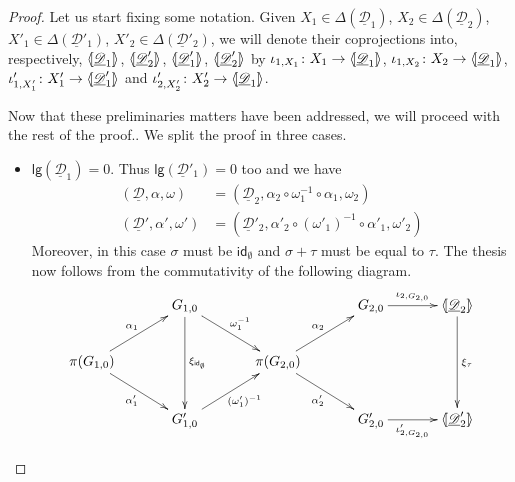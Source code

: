 \documentclass[a4paper]{article}
\newcommand{\id}[1]{\mathsf{id}_{#1}}
\newcommand{\dder}[1]{\mathscr{#1}}
\newcommand{\der}[1]{\underline{\dder{#1}}}
\newcommand{\lpro}{\langle \hspace{-1.85pt}[}
\newcommand{\rpro}{]\hspace{-1.85pt}\rangle}
\newcommand{\lgh}[0]{\mathsf{lg}}
\theoremstyle{definition}
\begin{document}
\begin{proof}
	Let us start fixing some notation. Given $X_1\in \Delta(\der{D}_1)$, $X_2\in \Delta(\der{D}_2)$, $X'_1\in \Delta(\der{D}'_1)$, $X'_2\in \Delta(\der{D}'_2)$, we will denote their coprojections into, respectively, $\lpro \der{D}_1\rpro$, $\lpro \der{D}'_2\rpro$, $\lpro \der{D}'_1\rpro$, $\lpro \der{D}'_2\rpro$ by
	$\iota_{1, X_1}\colon X_1\to \lpro\der{D}_1\rpro$, $\iota_{1, X_2}\colon X_2\to \lpro\der{D}_1\rpro$, $\iota'_{1, X'_1}\colon X'_1\to \lpro\der{D}'_1\rpro$ and $\iota'_{2, X'_2}\colon X'_2\to \lpro\der{D}_1\rpro$.
	
	Now that these preliminaries matters have been addressed, we will proceed with the rest of the proof.. We split the proof in three cases.
	\begin{itemize}
		\item $\lgh(\der{D}_1)=0$. Thus $\lgh(\der{D}'_1)=0$ too  and we have
		\begin{align*}
			(\der{D}, \alpha, \omega)&=(\der{D}_2, \alpha_2\circ \omega_1^{-1}\circ \alpha_1, \omega_2) \\ (\der{D}', \alpha', \omega')&=(\der{D}'_2, \alpha'_2\circ (\omega'_1)^{-1}\circ \alpha'_1, \omega'_2)
		\end{align*}
		Moreover, in this case $\sigma$ must be $\id{\emptyset}$ and $\sigma+\tau$ must be equal to $\tau$. The thesis now follows from the commutativity of the following diagram.
		\[\xymatrix@C=35pt{& G_{1,0}\ar[dd]^{\xi_{\id{\emptyset}}} \ar[dr]^{\omega^{-1}_1}&&G_{2,0}\ar[r]^-{\iota_{2, G_{2,0}}} & \lpro \der{D}_2\rpro \ar[dd]^{\xi_{\tau}}\\\pi(G_{1,0})  \ar[ur]^{\alpha_1} \ar[dr]_{\alpha'_1}&& \pi(G_{2,0}) \ar[ur]^{\alpha_2} \ar[dr]_{\alpha'_2}\\& G'_{1,0} \ar[ur]_{(\omega'_1)^{-1}}&&G'_{2,0} \ar[r]_-{\iota'_{2, G_{2,0}}}& \lpro \der{D}'_2\rpro}\]
		

\end{itemize}
\end{proof}
\end{document}
